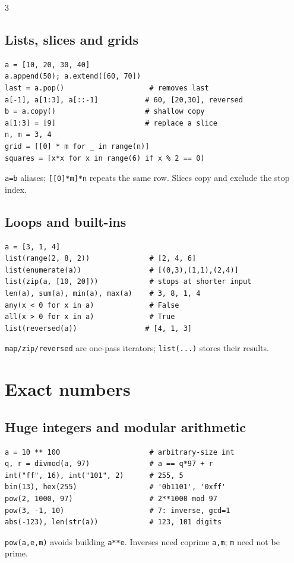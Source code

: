 \documentclass[9pt]{extarticle}
\let\referenceSubsection\subsection
\renewcommand{\subsection}{\needspace{4\baselineskip}\referenceSubsection}
\newcommand{\hint}[1]{{\small #1\par}}
\begin{document}
\begin{multicols*}{3}
\subsection{Lists, slices and grids}
\begin{lstlisting}[label=py:lists]
a = [10, 20, 30, 40]
a.append(50); a.extend([60, 70])
last = a.pop()                    # removes last
a[-1], a[1:3], a[::-1]           # 60, [20,30], reversed
b = a.copy()                     # shallow copy
a[1:3] = [9]                     # replace a slice
n, m = 3, 4
grid = [[0] * m for _ in range(n)]
squares = [x*x for x in range(6) if x % 2 == 0]
\end{lstlisting}
\hint{\texttt{a=b} aliases; \texttt{[[0]*m]*n} repeats the same row.
Slices copy and exclude the stop index.}

\subsection{Loops and built-ins}
\begin{lstlisting}[label=py:builtins]
a = [3, 1, 4]
list(range(2, 8, 2))              # [2, 4, 6]
list(enumerate(a))                # [(0,3),(1,1),(2,4)]
list(zip(a, [10, 20]))            # stops at shorter input
len(a), sum(a), min(a), max(a)    # 3, 8, 1, 4
any(x < 0 for x in a)             # False
all(x > 0 for x in a)             # True
list(reversed(a))                # [4, 1, 3]
\end{lstlisting}
\hint{\texttt{map/zip/reversed} are one-pass iterators;
\texttt{list(...)} stores their results.}

\section{Exact numbers}

\subsection{Huge integers and modular arithmetic}
\begin{lstlisting}[label=py:integers]
a = 10 ** 100                     # arbitrary-size int
q, r = divmod(a, 97)              # a == q*97 + r
int("ff", 16), int("101", 2)      # 255, 5
bin(13), hex(255)                 # '0b1101', '0xff'
pow(2, 1000, 97)                  # 2**1000 mod 97
pow(3, -1, 10)                    # 7: inverse, gcd=1
abs(-123), len(str(a))            # 123, 101 digits
\end{lstlisting}
\hint{\texttt{pow(a,e,m)} avoids building \texttt{a**e}.
Inverses need coprime \texttt{a,m}; \texttt{m} need not be prime.}


\end{multicols*}
\end{document}
